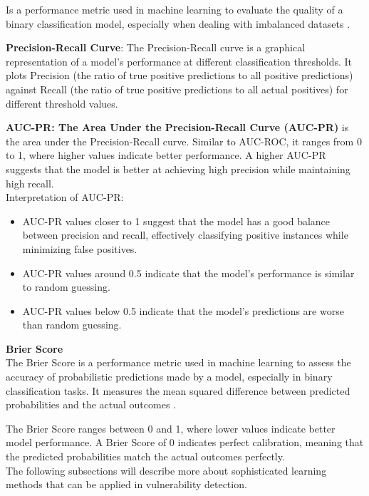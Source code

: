 Is a performance metric used in machine learning to evaluate the quality of a binary classification model, especially when dealing with imbalanced datasets \cite{Somogyi2021}.


\textbf{Precision-Recall Curve}: The Precision-Recall curve is a graphical representation of a model's performance at different classification thresholds. It plots Precision (the ratio of true positive predictions to all positive predictions) against Recall (the ratio of true positive predictions to all actual positives) for different threshold values.

\textbf{AUC-PR: The Area Under the Precision-Recall Curve (AUC-PR)} is the area under the Precision-Recall curve. Similar to AUC-ROC, it ranges from 0 to 1, where higher values indicate better performance. A higher AUC-PR suggests that the model is better at achieving high precision while maintaining high recall.\\

Interpretation of AUC-PR:

\begin{itemize}
\item AUC-PR values closer to 1 suggest that the model has a good balance between precision and recall, effectively classifying positive instances while minimizing false positives.
\item AUC-PR values around 0.5 indicate that the model's performance is similar to random guessing.
\item AUC-PR values below 0.5 indicate that the model's predictions are worse than random guessing.
\end{itemize}

\textbf{Brier Score}\\

The Brier Score is a performance metric used in machine learning to assess the accuracy of probabilistic predictions made by a model, especially in binary classification tasks. It measures the mean squared difference between predicted probabilities and the actual outcomes \cite{Somogyi2021}.

The Brier Score ranges between 0 and 1, where lower values indicate better model performance. A Brier Score of 0 indicates perfect calibration, meaning that the predicted probabilities match the actual outcomes perfectly.\\

The following subsections will describe more about sophisticated learning methods that can be applied in vulnerability detection.


